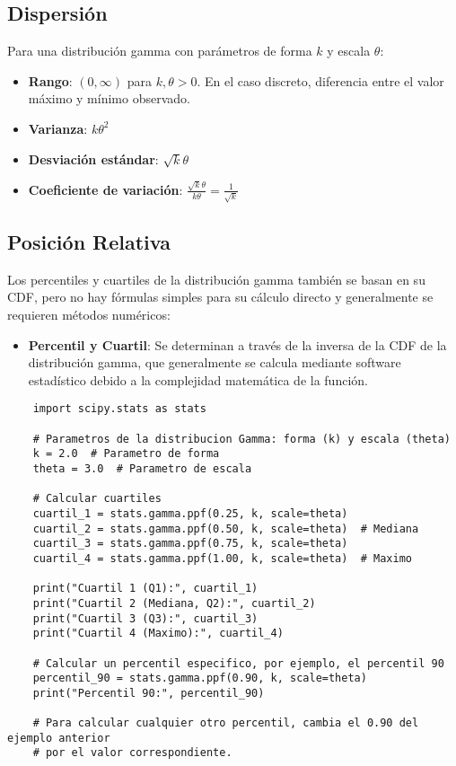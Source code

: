\documentclass[11pt]{article}
\begin{document}
\subsection*{Dispersión}
Para una distribución gamma con parámetros de forma \(k\) y escala \(\theta\):
\begin{itemize}
	\item \textbf{Rango}: \((0, \infty)\) para \(k, \theta > 0\). En el caso discreto, diferencia entre el valor máximo y mínimo observado.
	\item \textbf{Varianza}: \(k\theta^2\)
	\item \textbf{Desviación estándar}: \(\sqrt{k}\theta\)
	\item \textbf{Coeficiente de variación}: \(\frac{\sqrt{k}\theta}{k\theta} = \frac{1}{\sqrt{k}}\)
\end{itemize}

\subsection*{Posición Relativa}
Los percentiles y cuartiles de la distribución gamma también se basan en su CDF, pero no hay fórmulas simples para su cálculo directo y generalmente se requieren métodos numéricos:
\begin{itemize}
	\item \textbf{Percentil y Cuartil}: Se determinan a través de la inversa de la CDF de la distribución gamma, que generalmente se calcula mediante software estadístico debido a la complejidad matemática de la función.
\end{itemize}

\begin{lstlisting}
	import scipy.stats as stats
	
	# Parametros de la distribucion Gamma: forma (k) y escala (theta)
	k = 2.0  # Parametro de forma
	theta = 3.0  # Parametro de escala
	
	# Calcular cuartiles
	cuartil_1 = stats.gamma.ppf(0.25, k, scale=theta)
	cuartil_2 = stats.gamma.ppf(0.50, k, scale=theta)  # Mediana
	cuartil_3 = stats.gamma.ppf(0.75, k, scale=theta)
	cuartil_4 = stats.gamma.ppf(1.00, k, scale=theta)  # Maximo
	
	print("Cuartil 1 (Q1):", cuartil_1)
	print("Cuartil 2 (Mediana, Q2):", cuartil_2)
	print("Cuartil 3 (Q3):", cuartil_3)
	print("Cuartil 4 (Maximo):", cuartil_4)
	
	# Calcular un percentil especifico, por ejemplo, el percentil 90
	percentil_90 = stats.gamma.ppf(0.90, k, scale=theta)
	print("Percentil 90:", percentil_90)
	
	# Para calcular cualquier otro percentil, cambia el 0.90 del ejemplo anterior
	# por el valor correspondiente.
\end{lstlisting}
\end{document}
